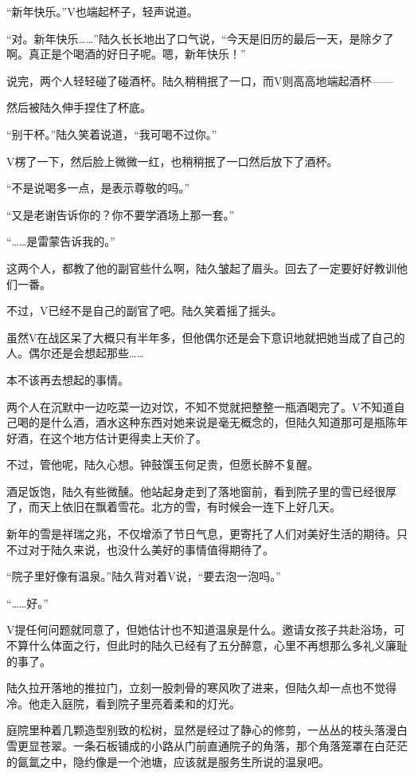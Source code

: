 “新年快乐。”V也端起杯子，轻声说道。

“对。新年快乐……”陆久长长地出了口气说，“今天是旧历的最后一天，是除夕了啊。真正是个喝酒的好日子呢。嗯，新年快乐！”

说完，两个人轻轻碰了碰酒杯。陆久稍稍抿了一口，而V则高高地端起酒杯——

然后被陆久伸手捏住了杯底。

“别干杯。”陆久笑着说道，“我可喝不过你。”

V楞了一下，然后脸上微微一红，也稍稍抿了一口然后放下了酒杯。

“不是说喝多一点，是表示尊敬的吗。”

“又是老谢告诉你的？你不要学酒场上那一套。”

“……是雷蒙告诉我的。”

这两个人，都教了他的副官些什么啊，陆久皱起了眉头。回去了一定要好好教训他们一番。

不过，V已经不是自己的副官了吧。陆久笑着摇了摇头。

虽然V在战区呆了大概只有半年多，但他偶尔还是会下意识地就把她当成了自己的人。偶尔还是会想起那些……

本不该再去想起的事情。

两个人在沉默中一边吃菜一边对饮，不知不觉就把整整一瓶酒喝完了。V不知道自己喝的是什么酒，酒水这种东西对她来说是毫无概念的，但陆久知道那可是瓶陈年好酒，在这个地方估计更得卖上天价了。

不过，管他呢，陆久心想。钟鼓馔玉何足贵，但愿长醉不复醒。

酒足饭饱，陆久有些微醺。他站起身走到了落地窗前，看到院子里的雪已经很厚了，而天上依旧在飘着雪花。北方的雪，有时候会一连下上好几天。

新年的雪是祥瑞之兆，不仅增添了节日气息，更寄托了人们对美好生活的期待。只不过对于陆久来说，也没什么美好的事情值得期待了。

“院子里好像有温泉。”陆久背对着V说，“要去泡一泡吗。”

“……好。”

V提任何问题就同意了，但她估计也不知道温泉是什么。邀请女孩子共赴浴场，可不算什么体面之行，但此时的陆久已经有了五分醉意，心里不再想那么多礼义廉耻的事了。

陆久拉开落地的推拉门，立刻一股刺骨的寒风吹了进来，但陆久却一点也不觉得冷。他走入庭院，看到院子里亮着柔和的灯光。

庭院里种着几颗造型别致的松树，显然是经过了静心的修剪，一丛丛的枝头落漫白雪更显苍翠。一条石板铺成的小路从门前直通院子的角落，那个角落笼罩在白茫茫的氤氲之中，隐约像是一个池塘，应该就是服务生所说的温泉吧。

